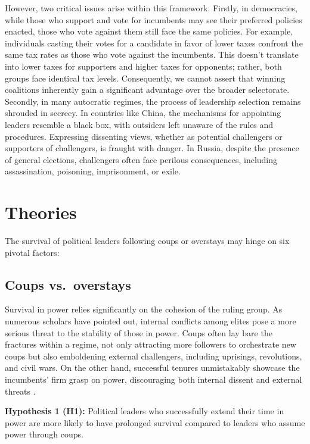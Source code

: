 \documentclass[
  12pt,
  a4paper,
  12pt]{article}
\begin{document}
However, two critical issues arise within this framework. Firstly, in
democracies, while those who support and vote for incumbents may see
their preferred policies enacted, those who vote against them still face
the same policies. For example, individuals casting their votes for a
candidate in favor of lower taxes confront the same tax rates as those
who vote against the incumbents. This doesn't translate into lower taxes
for supporters and higher taxes for opponents; rather, both groups face
identical tax levels. Consequently, we cannot assert that winning
coalitions inherently gain a significant advantage over the broader
selectorate. Secondly, in many autocratic regimes, the process of
leadership selection remains shrouded in secrecy. In countries like
China, the mechanisms for appointing leaders resemble a black box, with
outsiders left unaware of the rules and procedures. Expressing
dissenting views, whether as potential challengers or supporters of
challengers, is fraught with danger. In Russia, despite the presence of
general elections, challengers often face perilous consequences,
including assassination, poisoning, imprisonment, or exile.

\hypertarget{theories}{%
\section{Theories}\label{theories}}

The survival of political leaders following coups or overstays may hinge
on six pivotal factors:

\hypertarget{coups-vs.-overstays}{%
\subsection{Coups vs.~overstays}\label{coups-vs.-overstays}}

Survival in power relies significantly on the cohesion of the ruling
group. As numerous scholars have pointed out, internal conflicts among
elites pose a more serious threat to the stability of those in power.
Coups often lay bare the fractures within a regime, not only attracting
more followers to orchestrate new coups but also emboldening external
challengers, including uprisings, revolutions, and civil wars. On the
other hand, successful tenures unmistakably showcase the incumbents'
firm grasp on power, discouraging both internal dissent and external
threats \citep{dahl2023}.

\textbf{Hypothesis 1 (H1):} Political leaders who successfully extend
their time in power are more likely to have prolonged survival compared
to leaders who assume power through coups.
\end{document}
